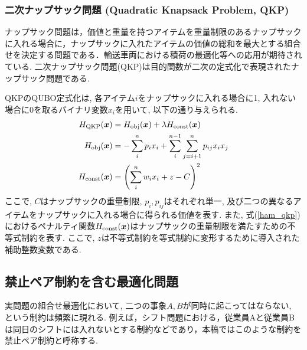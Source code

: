 \documentclass[submit,techrep,noauthor]{ipsj}
\begin{document}
\subsubsection{二次ナップサック問題 (Quadratic Knapsack Problem, QKP)}
ナップサック問題は，価値と重量を持つアイテムを重量制限のあるナップサックに入れる場合に，ナップサックに入れたアイテムの価値の総和を最大とする組合せを決定する問題である．輸送車両における積荷の最適化等への応用が期待されている. 二次ナップサック問題(QKP)は目的関数が二次の定式化で表現されたナップサック問題である. 


QKPのQUBO定式化は, 各アイテム$i$をナップサックに入れる場合に1, 入れない場合に0を取るバイナリ変数$x_{i}$を用いて, 以下の通り与えられる.
\begin{align}
H_{\rm{QKP}}(\bm{x}) &= H_{\rm{obj}}(\bm{x}) + \lambda H_{\rm{const}}(\bm{x})\nonumber\\
H_{\rm{obj}}(\bm{x}) &= -\sum_{i}^{n}p_{i}x_{i}+\sum_{i}^{n-1}\sum_{j=i+1}^{n}p_{ij}x_{i}x_{j}\nonumber\\
H_{\rm{const}}(\bm{x}) &= \left(\sum_{i}^{n}w_{i}x_{i}+z-C\right)^{2} \label{ham_qkp}
\end{align}
ここで, $C$はナップサックの重量制限, $p_{i}, p_{ij}$はそれぞれ単一, 及び二つの異なるアイテムをナップサックに入れる場合に得られる価値を表す. また, 式(\ref{ham_qkp})におけるペナルティ関数$H_{\rm{const}}(\bm{x})$はナップサックの重量制限を満たすための不等式制約を表す. ここで, $z$は不等式制約を等式制約に変形するために導入された補助整数変数である.

\subsection{禁止ペア制約を含む最適化問題}
実問題の組合せ最適化において, 二つの事象$A, B$が同時に起こってはならない, という制約は頻繁に現れる. 例えば，シフト問題における，従業員Aと従業員Bは同日のシフトには入れないとする制約などであり，本稿ではこのような制約を禁止ペア制約と呼称する. 
\end{document}
